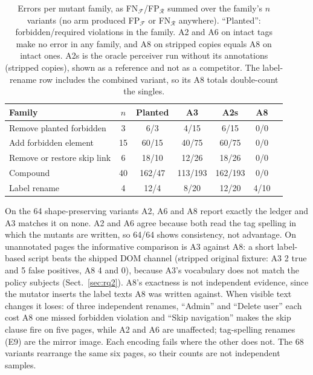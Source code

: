 \begin{table}[tbp]
\caption{Errors per mutant family, as FN$_\mathcal F$/FP$_\mathcal R$ summed over the
family's $n$ variants (no arm produced FP$_\mathcal F$ or FN$_\mathcal R$ anywhere).
``Planted'': forbidden/required violations in the family. A2 and A6 on intact
tags make no error in any family, and A8 on stripped copies equals A8 on intact
ones. A2s is the oracle perceiver run without its annotations (stripped copies),
shown as a reference and not as a competitor. The label-rename row includes the
combined variant, so its A8 totals double-count the singles.}
\label{tab:mutants}
\setlength{\tabcolsep}{3pt}
\footnotesize
\begin{tabular}{@{}lcccccc@{}}
\toprule
Family & $n$ & Planted & A3 & A2s & A8 \\
\midrule
Remove planted forbidden & 3 & 6/3 & 4/15 & 6/15 & 0/0 \\
Add forbidden element & 15 & 60/15 & 40/75 & 60/75 & 0/0 \\
Remove or restore skip link & 6 & 18/10 & 12/26 & 18/26 & 0/0 \\
Compound & 40 & 162/47 & 113/193 & 162/193 & 0/0 \\
Label rename & 4 & 12/4 & 8/20 & 12/20 & 4/10 \\
\bottomrule
\end{tabular}
\end{table}

On the 64 shape-preserving variants A2, A6 and A8 report exactly the ledger and A3
matches it on none. A2 and A6 agree because both read the tag spelling in which the
mutants are written, so 64/64 shows consistency, not advantage. On unannotated pages
the informative comparison is A3 against A8: a short label-based script beats the
shipped DOM channel (stripped original fixture: A3 2 true and 5 false positives,
A8 4 and 0), because A3's vocabulary does not match the policy subjects
(Sect.~\ref{sec:rq2}). A8's exactness is not independent evidence, since the
mutator inserts the label texts A8 was written against. When visible text changes
it loses: of three independent renames, ``Admin'' and ``Delete user'' each cost A8
one missed forbidden violation and ``Skip navigation'' makes the skip clause fire
on five pages, while A2 and A6 are unaffected; tag-spelling renames (E9) are the
mirror image. Each encoding fails where the other does not. The 68 variants
rearrange the same six pages, so their counts are not independent samples.

